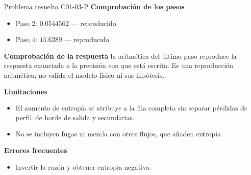 \documentclass[10pt,openany]{book}
\begin{document}
\begin{studiumworked}{Problema resuelto C01-03-P}
\noindent\textbf{Comprobación de los pasos}
\begin{itemize}
\item Paso 2: $0.0544562$ — reproducido
\item Paso 4: $15.6289$ — reproducido
\end{itemize}

\noindent\textbf{Comprobación de la respuesta} la aritmética del último paso reproduce la respuesta enunciada a la precisión con que está escrita. Es una reproducción aritmética; no valida el modelo físico ni sus hipótesis.

\noindent\textbf{Limitaciones}
\begin{itemize}
\item El aumento de entropía se atribuye a la fila completa sin separar pérdidas de perfil, de borde de salida y secundarias.
\item No se incluyen fugas ni mezcla con otros flujos, que añaden entropía.
\end{itemize}

\noindent\textbf{Errores frecuentes}
\begin{itemize}
\item Invertir la razón y obtener entropía negativa.
\end{itemize}
\end{studiumworked}
\end{document}
